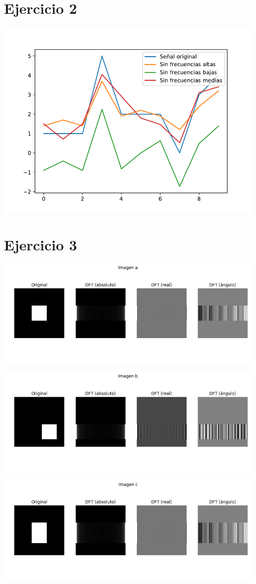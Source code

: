 \documentclass[a4paper]{article}
\begin{document}
\section{Ejercicio 2}
\includegraphics[scale=0.7]{imgs/2.pdf}
\section{Ejercicio 3}
\includegraphics[scale=0.5]{imgs/3-a.png}

\includegraphics[scale=0.5]{imgs/3-b.png}

\includegraphics[scale=0.5]{imgs/3-c.png}
\end{document}
